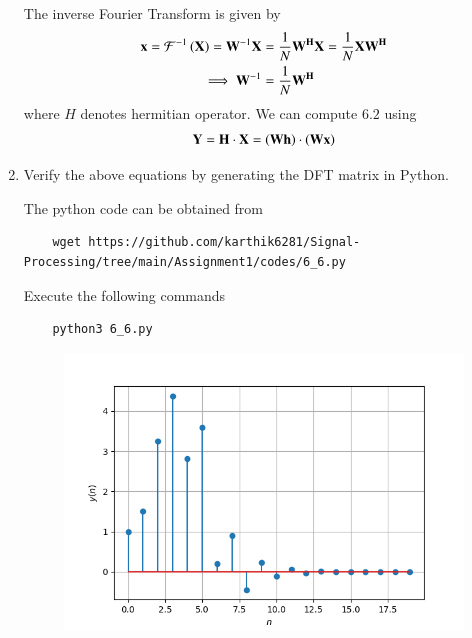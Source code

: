 \documentclass[journal,12pt,twocolumn]{IEEEtran}
\renewcommand\thesection{\arabic{section}}
\begin{document}
\begin{enumerate}[label=\thesection.\arabic*]
  The inverse Fourier Transform is given by
	\begin{align}
		\mathbf{x} = \mathcal{F}^{-1}\left(\mathbf{X}\right) = \mathbf{W}^{-1}\mathbf{X} &= \frac{1}{N}\mathbf{W^{H}}\mathbf{X} = \frac{1}{N}\mathbf{X}\mathbf{W^{H}} \\ 
		\implies \mathbf{W}^{-1} &= \frac{1}{N}\mathbf{W^{H}}
	\end{align}
	\noindent where $H$ denotes hermitian operator. We can compute $6.2$ using 
	\begin{align}
		\mathbf{Y} = \mathbf{H}\cdot\mathbf{X} = \left(\mathbf{W}\mathbf{h}\right)\cdot\left(\mathbf{W}\mathbf{x}\right)
	\end{align}

 \item Verify the above equations by generating the DFT matrix in Python.
 
 \solution The python code can be obtained from 
 \begin{lstlisting}
 	wget https://github.com/karthik6281/Signal-Processing/tree/main/Assignment1/codes/6_6.py
 \end{lstlisting}
 
 Execute the  following commands
 \begin{lstlisting}
 	python3 6_6.py
 \end{lstlisting}
 
 \begin{figure}[!ht]
 	\centering
 	\includegraphics[width=0.8\columnwidth]{./figs/6_6.png}
 	\label{fig-6.5}	
 \end{figure}
 
\end{enumerate}
\end{document}
